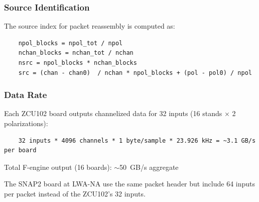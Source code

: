 \subsubsection{Source Identification}

The source index for packet reassembly is computed as:
\begin{verbatim}
    npol_blocks = npol_tot / npol
    nchan_blocks = nchan_tot / nchan
    nsrc = npol_blocks * nchan_blocks
    src = (chan - chan0)  / nchan * npol_blocks + (pol - pol0) / npol
\end{verbatim}

\subsubsection{Data Rate}

Each ZCU102 board outputs channelized data for 32 inputs (16 stands $\times$ 2 polarizations):

\begin{verbatim}
    32 inputs * 4096 channels * 1 byte/sample * 23.926 kHz = ~3.1 GB/s per board
\end{verbatim}

Total F-engine output (16 boards): $\sim$50~GB/s aggregate

\begin{siteNote}
The SNAP2 board at LWA-NA use the same packet header but include 64 inputs per packet instead of the ZCU102's 32 inputs.
\end{siteNote}
